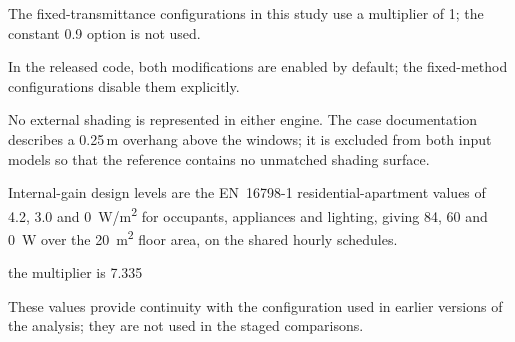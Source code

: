 The fixed-transmittance configurations in this study use a multiplier of 1;
the constant 0.9 option is not used.


In the released code, both modifications are enabled by default; the
fixed-method configurations disable them explicitly.


No external shading is represented in either engine. The case documentation
describes a 0.25\,m overhang above the windows; it is excluded from both input
models so that the reference contains no unmatched shading surface.


Internal-gain design levels are the EN~16798-1 residential-apartment values of
4.2, 3.0 and 0~W/m\textsuperscript{2} for occupants, appliances and lighting,
giving 84, 60 and 0~W over the 20~m\textsuperscript{2} floor area, on the
shared hourly schedules.


the multiplier is 7.335


These values provide continuity with the configuration used in earlier
versions of the analysis; they are not used in the staged comparisons.

